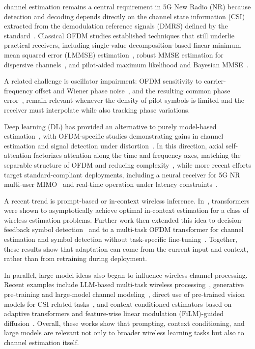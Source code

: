 \documentclass[conference,letterpaper]{IEEEtran}
\begin{document}
	
	 channel estimation remains a central requirement in 5G New Radio (NR) because detection and decoding depends directly on the channel state information (CSI) extracted from the demodulation reference signals (DMRS) defined by the standard~\cite{3gpp38211,3gpp38214}. Classical OFDM studies established techniques that still underlie practical receivers, including single-value decomposition-based linear minimum mean squared error (LMMSE) estimation~\cite{edfors1998}, robust MMSE estimation for dispersive channels~\cite{li1998}, and pilot-aided maximum likelihood and Bayesian MMSE~\cite{morelli2001}.
	
	A related challenge is oscillator impairment: OFDM sensitivity to carrier-frequency offset and Wiener phase noise~\cite{pollet1995}, and the resulting common phase error~\cite{wu2004}, remain relevant whenever the density of pilot symbols is limited and the receiver must interpolate while also tracking phase variations.
	
	Deep learning (DL) has provided an alternative to purely model-based estimation~\cite{oshea2017,qin2019,he2019}, with OFDM-specific studies demonstrating gains in channel estimation and signal detection under distortion~\cite{ye2018}.
	In this direction, axial self-attention factorizes attention along the time and frequency axes, matching the separable structure of OFDM and reducing complexity~\cite{yellapragada2025}, while more recent efforts target standard-compliant deployments, including a neural receiver for 5G NR multi-user MIMO~\cite{cammerer2023} and real-time operation under latency constraints~\cite{wiesmayr2025}.
	
	A recent trend is prompt-based or in-context wireless inference. In~\cite{kunde2025}, transformers were shown to asymptotically achieve optimal in-context estimation for a class of wireless estimation problems. Further   work then extended this idea to decision-feedback symbol detection~\cite{fan2025} and to a multi-task OFDM transformer for channel estimation and symbol detection without task-specific fine-tuning~\cite{kou2025}. Together, these results show that adaptation can come from the current input and context, rather than from retraining during deployment.
	
	In parallel, large-model ideas also began to influence wireless channel processing. Recent examples include LLM-based multi-task wireless processing~\cite{llm4wm2025}, generative pre-training and large-model channel modeling~\cite{wirelessgpt2025,channelgpt2025}, direct use of pre-trained vision models for CSI-related tasks~\cite{lvm4csi2025}, and context-conditioned estimators based on adaptive transformers and feature-wise linear modulation (FiLM)-guided diffusion~\cite{adafortitran2025,mohsin2025}. Overall, these works show that prompting, context conditioning, and large models are relevant not only to broader wireless learning tasks but also to channel estimation itself.
	
\end{document}
